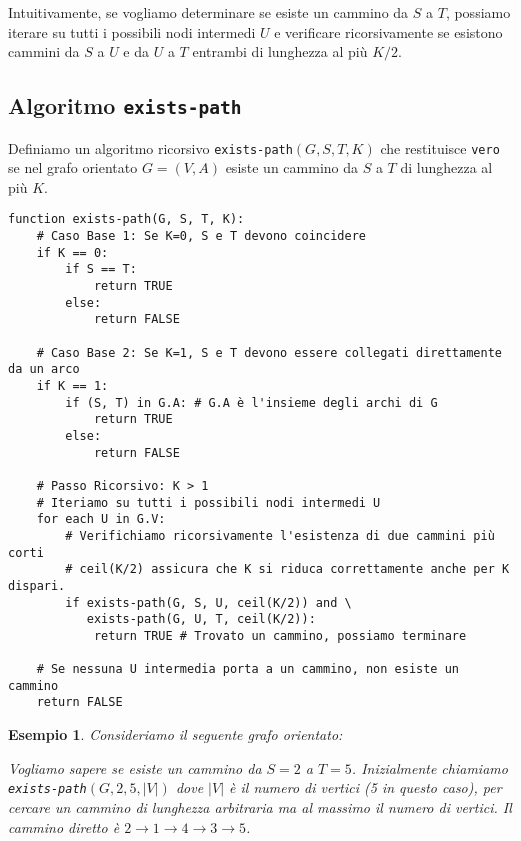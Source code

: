 \documentclass[a4paper]{article}
\newtheorem{example}{Esempio}
\begin{document}
Intuitivamente, se vogliamo determinare se esiste un cammino da $S$ a $T$, possiamo iterare su tutti i possibili nodi intermedi $U$ e verificare ricorsivamente se esistono cammini da $S$ a $U$ e da $U$ a $T$ entrambi di lunghezza al più $K/2$.

\subsection{Algoritmo \texttt{exists-path}}
Definiamo un algoritmo ricorsivo \texttt{exists-path}$(G, S, T, K)$ che restituisce \texttt{vero} se nel grafo orientato $G=(V,A)$ esiste un cammino da $S$ a $T$ di lunghezza al più $K$.

\begin{verbatim}
function exists-path(G, S, T, K):
    # Caso Base 1: Se K=0, S e T devono coincidere
    if K == 0:
        if S == T:
            return TRUE
        else:
            return FALSE

    # Caso Base 2: Se K=1, S e T devono essere collegati direttamente da un arco
    if K == 1:
        if (S, T) in G.A: # G.A è l'insieme degli archi di G
            return TRUE
        else:
            return FALSE
    
    # Passo Ricorsivo: K > 1
    # Iteriamo su tutti i possibili nodi intermedi U
    for each U in G.V:
        # Verifichiamo ricorsivamente l'esistenza di due cammini più corti
        # ceil(K/2) assicura che K si riduca correttamente anche per K dispari.
        if exists-path(G, S, U, ceil(K/2)) and \
           exists-path(G, U, T, ceil(K/2)):
            return TRUE # Trovato un cammino, possiamo terminare
            
    # Se nessuna U intermedia porta a un cammino, non esiste un cammino
    return FALSE
\end{verbatim}

\begin{example}
Consideriamo il seguente grafo orientato:
\begin{center}
\end{center}
Vogliamo sapere se esiste un cammino da $S=2$ a $T=5$. Inizialmente chiamiamo \texttt{exists-path}$(G, 2, 5, |V|)$ dove $|V|$ è il numero di vertici (5 in questo caso), per cercare un cammino di lunghezza arbitraria ma al massimo il numero di vertici.
Il cammino diretto è $2 \to 1 \to 4 \to 3 \to 5$.
\end{example}
\end{document}
